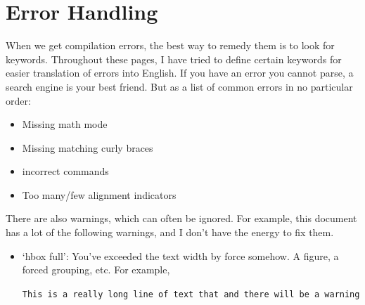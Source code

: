 \documentclass[twocolumn]{article}
\begin{document}
\section{Error Handling}\label{sec:Errors}
When we get compilation errors, the best way to remedy them is to look for keywords. Throughout these pages, I have tried to define certain keywords for easier translation of errors into English. If you have an error you cannot parse, a search engine is your best friend. But as a list of common errors in no particular order:
\begin{itemize}
    \item Missing math mode
    \item Missing matching curly braces
    \item incorrect commands
    \item Too many/few alignment indicators
\end{itemize}
There are also warnings, which can often be ignored. For example, this document has a lot of the following warnings, and I don't have the energy to fix them.
\begin{itemize}
    \item `hbox full': You've exceeded the text width by force somehow. A figure, a forced grouping, etc. For example,

    \verb|This is a really long line of text that and there will be a warning|
\end{itemize}
\end{document}
